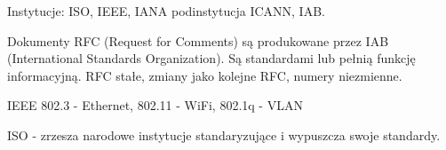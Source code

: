 \documentclass[../main.tex]{subfiles}
\begin{document}
    Instytucje: ISO, IEEE, IANA podinstytucja ICANN, IAB.

    Dokumenty RFC (Request for Comments) są produkowane przez IAB (International Standards Organization).
    Są standardami lub pełnią funkcję informacyjną.
    RFC stałe, zmiany jako kolejne RFC, numery niezmienne.

    IEEE 802.3 - Ethernet, 802.11 - WiFi, 802.1q - VLAN

    ISO - zrzesza narodowe instytucje standaryzujące i wypuszcza swoje standardy.
\end{document}
